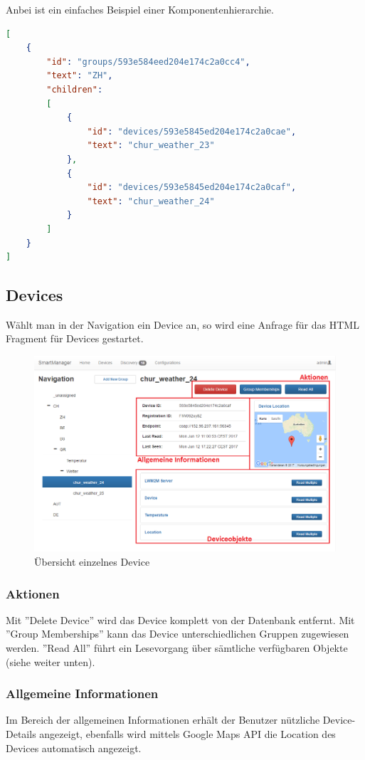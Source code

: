 Anbei ist ein einfaches Beispiel einer Komponentenhierarchie.

\begin{lstlisting}[language=json]
[
	{
		"id": "groups/593e584eed204e174c2a0cc4",
		"text": "ZH",
		"children": 
	  	[
		  	{
				"id": "devices/593e5845ed204e174c2a0cae",
				"text": "chur_weather_23"
			},
			{
				"id": "devices/593e5845ed204e174c2a0caf",
				"text": "chur_weather_24"
			}
		]
	}
]
\end{lstlisting}
 \newpage

\subsection{Devices}
Wählt man in der Navigation ein Device an, so wird eine Anfrage für das HTML Fragment für Devices gestartet. 

\begin{figure}[H]
\centering
\includegraphics[scale=0.57]{../04_Realisierung/images/userinterface/devicefragment_collapsed.png}
\caption{Übersicht einzelnes Device}
\end{figure}

\subsubsection{Aktionen}
Mit ''Delete Device'' wird das Device komplett von der Datenbank entfernt. Mit ''Group Memberships'' kann das Device unterschiedlichen Gruppen zugewiesen werden. ''Read All'' führt ein Lesevorgang über sämtliche verfügbaren Objekte (siehe weiter unten).

\subsubsection{Allgemeine Informationen}
Im Bereich der allgemeinen Informationen erhält der Benutzer nützliche Device-Details angezeigt, ebenfalls wird mittels Google Maps API die Location des Devices automatisch angezeigt.
\newpage
